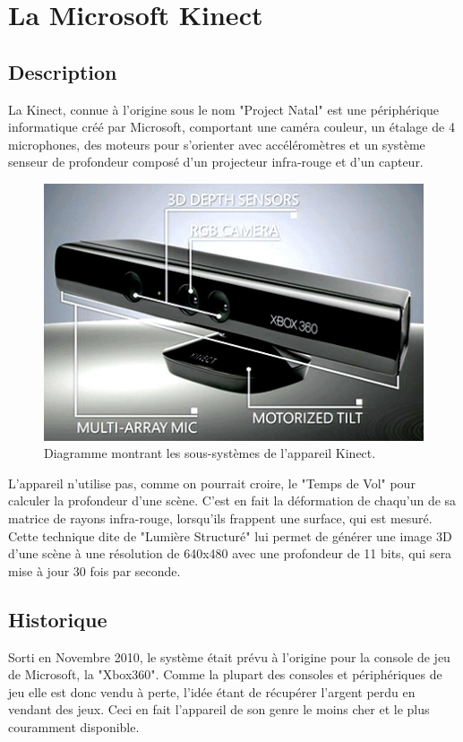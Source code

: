 \section{La Microsoft Kinect}

\subsection{Description}
La Kinect, connue à l'origine sous le nom "Project Natal" est une
périphérique informatique créé par Microsoft, comportant une caméra
couleur, un étalage de 4 microphones, des moteurs pour s'orienter avec 
accéléromètres 
et un système senseur de profondeur composé d'un 
projecteur infra-rouge et d'un capteur. 
  \begin{figure}[h!]
  \centering
  \includegraphics[width=0.8\linewidth]{images/kinect_diagram}
  \caption{Diagramme montrant les sous-systèmes de l'appareil Kinect.}
  \end{figure}
L'appareil n'utilise pas, comme on pourrait croire, le "Temps de Vol" pour
calculer la profondeur d'une scène. C'est en fait la déformation de chaqu'un de 
sa matrice de rayons infra-rouge,
lorsqu'ils frappent une surface, qui est mesuré. Cette technique dite de 
"Lumière Structuré"
lui permet de générer une image 3D d'une scène à une résolution de 640x480 avec 
une profondeur de 11 bits, qui sera mise à jour 30 fois par seconde.

\subsection{Historique}
Sorti en Novembre 2010, le système était prévu à l'origine pour la console
de jeu de Microsoft, la "Xbox360". Comme la plupart des consoles et
périphériques de jeu elle
est donc vendu à perte, l'idée étant de récupérer l'argent perdu en vendant
des jeux. Ceci en fait l'appareil de son genre le moins cher et le plus couramment
disponible.


